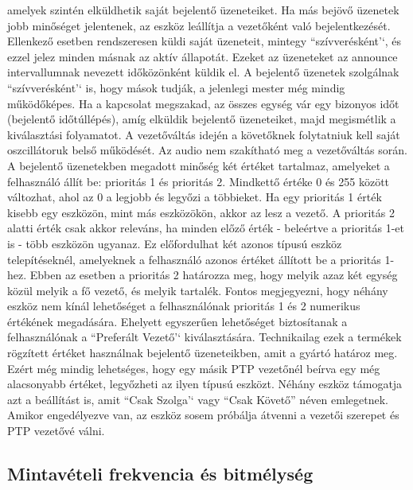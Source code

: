 amelyek szintén elküldhetik saját bejelentő üzeneteiket. Ha más bejövő üzenetek
jobb minőséget jelentenek, az eszköz leállítja a vezetőként való bejelentkezését.
Ellenkező esetben rendszeresen küldi saját üzeneteit, mintegy ``szívverésként'`,
és ezzel jelez minden másnak az aktív állapotát. Ezeket az üzeneteket az
announce intervallumnak nevezett időközönként küldik el. A bejelentő üzenetek
szolgálnak ``szívverésként'` is, hogy mások tudják, a jelenlegi mester még
mindig működőképes. Ha a kapcsolat megszakad, az összes egység vár egy bizonyos
időt (bejelentő időtúllépés), amíg elküldik bejelentő üzeneteiket, majd
megismétlik a kiválasztási folyamatot. A vezetőváltás idején a követőknek
folytatniuk kell saját oszcillátoruk belső működését. Az audio nem szakítható
meg a vezetőváltás során. A bejelentő üzenetekben megadott minőség két értéket
tartalmaz, amelyeket a felhasználó állít be: prioritás 1 és prioritás 2.
Mindkettő értéke 0 és 255 között változhat, ahol az 0 a legjobb és legyőzi a
többieket. Ha egy prioritás 1 érték kisebb egy eszközön, mint más eszközökön,
akkor az lesz a vezető. A prioritás 2 alatti érték csak akkor releváns, ha
minden előző érték - beleértve a prioritás 1-et is - több eszközön ugyanaz. Ez
előfordulhat két azonos típusú eszköz telepítéseknél, amelyeknek a felhasználó
azonos értéket állított be a prioritás 1-hez. Ebben az esetben a prioritás 2
határozza meg, hogy melyik azaz két egység közül melyik a fő vezető, és melyik
tartalék. Fontos megjegyezni, hogy néhány eszköz nem kínál lehetőséget a
felhasználónak prioritás 1 és 2 numerikus értékének megadására. Ehelyett
egyszerűen lehetőséget biztosítanak a felhasználónak a ``Preferált Vezető'`
kiválasztására. Technikailag ezek a termékek rögzített értéket használnak
bejelentő üzeneteikben, amit a gyártó határoz meg. Ezért még mindig lehetséges,
hogy egy másik PTP vezetőnél beírva egy még alacsonyabb értéket, legyőzheti az
ilyen típusú eszközt. Néhány eszköz támogatja azt a beállítást is, amit ``Csak
Szolga'` vagy ``Csak Követő'' néven emlegetnek. Amikor engedélyezve van, az
eszköz sosem próbálja átvenni a vezetői szerepet és PTP vezetővé válni.


\subsection{Mintavételi frekvencia és bitmélység}
 




